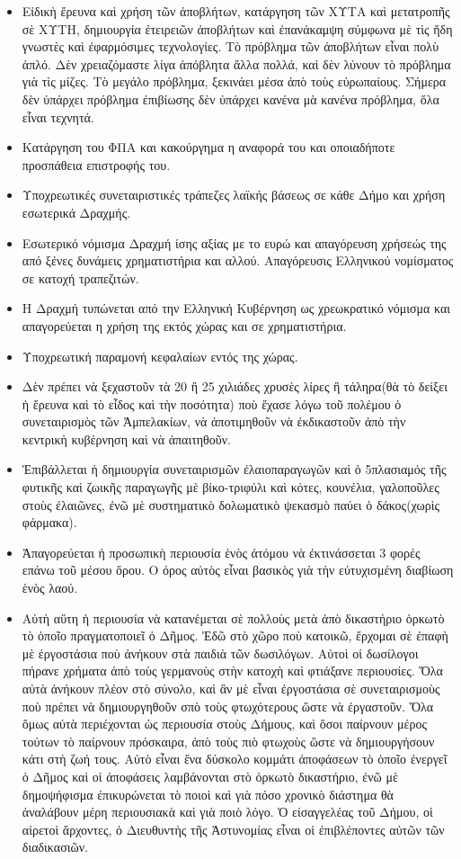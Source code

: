 \documentclass[a4paper]{article}
\begin{document}
\begin{itemize}
\item Εἰδικὴ ἔρευνα καὶ χρήση τῶν ἀποβλήτων, κατάργηση τῶν ΧΥΤΑ καὶ μετατροπῆς σὲ ΧΥΤΗ, δημιουργία ἐτειρειῶν ἀποβλήτων καὶ ἐπανάκαμψη σύμφωνα μὲ τὶς ἤδη γνωστὲς καὶ ἐφαρμόσιμες τεχνολογίες. Τὸ πρόβλημα τῶν ἀποβλήτων εἶναι πολὺ ἁπλό. Δὲν χρειαζόμαστε λίγα ἀπόβλητα ἄλλα πολλά, καὶ δὲν λύνουν τὸ πρόβλημα γιὰ τὶς μίζες. Τὸ μεγάλο πρόβλημα, ξεκινάει μέσα ἀπὸ τοὺς εὐρωπαίους. Σήμερα δὲν ὑπάρχει πρόβλημα ἐπιβίωσης δὲν ὑπάρχει κανένα μὰ κανένα πρόβλημα, ὅλα εἶναι τεχνητά.
\item Κατάργηση του ΦΠΑ και κακούργημα η αναφορά του και οποιαδήποτε προσπάθεια επιστροφής του.
\item Υποχρεωτικές συνεταιριστικές τράπεζες λαϊκής βάσεως σε κάθε Δήμο και χρήση εσωτερικά Δραχμής.
\item Εσωτερικό νόμισμα Δραχμή ίσης αξίας με το ευρώ και απαγόρευση χρήσεώς της από ξένες δυνάμεις χρηματιστήρια και αλλού. Απαγόρευσις Ελληνικού νομίσματος σε κατοχή τραπεζιτών.
\item Η Δραχμή τυπώνεται από την Ελληνική Κυβέρνηση ως χρεωκρατικό νόμισμα και απαγορεύεται η χρήση της εκτός χώρας και σε χρηματιστήρια.
\item Υποχρεωτική παραμονή κεφαλαίων εντός της χώρας.
\item Δὲν πρέπει νὰ ξεχαστοῦν τὰ 20 ἢ 25 χιλιάδες χρυσὲς λίρες ἢ τάληρα(θὰ τὸ δείξει ἡ ἔρευνα καὶ τὸ εἶδος καὶ τὴν ποσότητα) ποὺ ἔχασε λόγω τοῦ πολέμου ὁ συνεταιρισμὸς τῶν Ἀμπελακίων, νὰ ἀποτιμηθοῦν νὰ ἐκδικαστοῦν ἀπὸ τὴν κεντρικὴ κυβέρνηση καὶ νὰ ἀπαιτηθοῦν.
\item Ἐπιβάλλεται ἡ δημιουργία συνεταιρισμῶν ἐλαιοπαραγωγῶν καὶ ὁ 5πλασιαμός τῆς φυτικῆς καὶ ζωικῆς παραγωγῆς μὲ βίκο-τριφύλι καὶ κότες, κουνέλια, γαλοποῦλες στοὺς ἐλαιῶνες, ἐνῶ μὲ συστηματικὸ δολωματικὸ ψεκασμὸ παύει ὁ δάκος(χωρὶς φάρμακα).
\item Ἀπαγορεύεται ἡ προσωπικὴ περιουσία ἑνὸς ἀτόμου νὰ ἐκτινάσσεται 3 φορές επάνω τοῦ μέσου ὄρου. Ο όρος αὐτὸς εἶναι βασικὸς γιὰ τὴν εὐτυχισμένη διαβίωση ἑνὸς λαού.
\item Αὐτὴ αὕτη ἡ περιουσία νὰ κατανέμεται σὲ πολλοὺς μετὰ ἀπὸ δικαστήριο ὁρκωτὸ τὸ ὁποῖο πραγματοποιεῖ ὁ Δῆμος. Ἐδῶ στὸ χῶρο ποὺ κατοικῶ, ἔρχομαι σὲ ἐπαφὴ μὲ ἐργοστάσια ποὺ ἀνήκουν στὰ παιδιὰ τῶν δωσιλόγων. Αὐτοὶ οἱ δωσίλογοι πήρανε χρήματα ἀπὸ τοὺς γερμανοὺς στὴν κατοχὴ καὶ φτιάξανε περιουσίες. Ὅλα αὐτὰ ἀνήκουν πλέον στὸ σύνολο, καὶ ἂν μὲ εἶναι ἐργοστάσια σὲ συνεταιρισμοὺς ποὺ πρέπει νὰ δημιουργηθοῦν σπὸ τοὺς φτωχότερους ὥστε νὰ ἐργαστοῦν. Ὅλα ὅμως αὐτὰ περιέχονται ὡς περιουσία στοὺς Δήμους, καὶ ὅσοι παίρνουν μέρος τούτων τὸ παίρνουν πρόσκαιρα, ἀπὸ τοὺς πιὸ φτωχοὺς ὥστε νὰ δημιουργήσουν κάτι στὴ ζωή τους. Αὐτὸ εἶναι ἕνα δύσκολο κομμάτι ἀποφάσεων τὸ ὁποῖο ἐνεργεῖ ὁ Δῆμος καὶ οἱ ἀποφάσεις λαμβάνονται στὸ ὁρκωτὸ δικαστήριο, ἐνῶ μὲ δημοψήφισμα ἐπικυρώνεται τὸ ποιοὶ καὶ γιὰ πόσο χρονικὸ διάστημα θὰ ἀναλάβουν μέρη περιουσιακὰ καὶ γιὰ ποιὸ λόγο. Ὁ εἰσαγγελέας τοῦ Δήμου, οἱ αἱρετοὶ ἄρχοντες, ὁ Διευθυντὴς τῆς Ἀστυνομίας εἶναι οἱ ἐπιβλέποντες αὐτῶν τῶν διαδικασιῶν.

\end{itemize}
\end{document}

